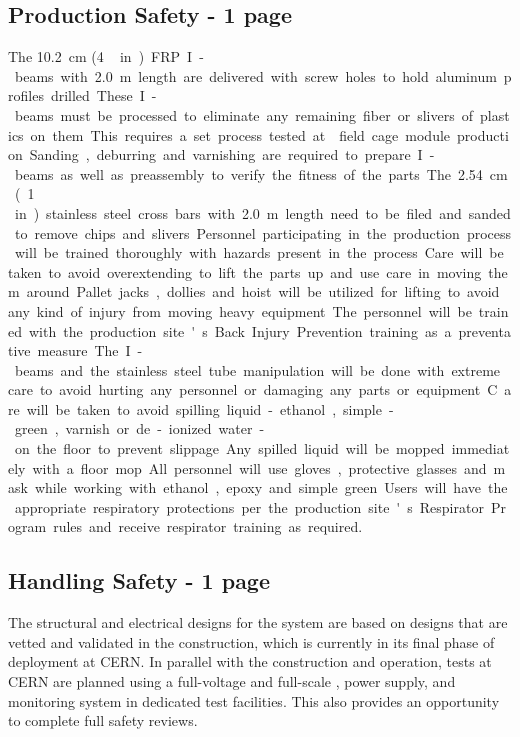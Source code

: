 \subsection{Production Safety - 1 page}
\label{sec:fddp-hv-prod-safety}
\clearpage
The \SI{10.2}{\cm} (\SI{4}\,in) FRP I-beams with \SI{2.0}{\m} length are delivered with screw holes to hold aluminum profiles drilled.
These I-beams must be processed to eliminate any remaining fiber or slivers of plastics on them.
This requires a set process tested at  field cage module production.
Sanding, deburring and varnishing are required to prepare I-beams as well as preassembly to verify the fitness of the parts. 
The \SI{2.54}{\cm} (\SI{1}\,in) stainless steel cross bars with \SI{2.0}{\m} length need to be filed and sanded to remove chips and slivers.

Personnel participating in the production process will be trained thoroughly with hazards present in the process.  
Care will be taken to avoid overextending to lift the parts up and use care in moving them around. 
Pallet jacks, dollies and hoist will be utilized for lifting to avoid any kind of injury from moving heavy equipment. 
The personnel will be trained with the production site's Back Injury Prevention training as a preventative measure.
The I-beams and the stainless steel tube manipulation will be done with extreme care to avoid hurting any personnel or damaging any parts or equipment. 
C
are will be taken to avoid spilling liquid - ethanol, simple-green, varnish or de-ionized water - on the floor to prevent slippage. 
Any spilled liquid will be mopped immediately with a floor mop.
All personnel will use gloves, protective glasses and mask while
working with ethanol, epoxy and simple green. 
Users will have the appropriate respiratory protections per the production site's Respirator Program rules and receive respirator training as
required.

\subsection{Handling Safety -  1 page}
\label{sec:fddp-hv-transport-safety}

The structural and electrical designs for the   system are based on designs that are vetted and validated in the  construction, which is currently in its final phase of deployment at CERN. In parallel with the  construction and operation,  tests at CERN are planned using %
a full-voltage and full-scale  \fdth, power supply, and monitoring system in dedicated  test facilities. This also provides an opportunity %
to complete full safety reviews. 

